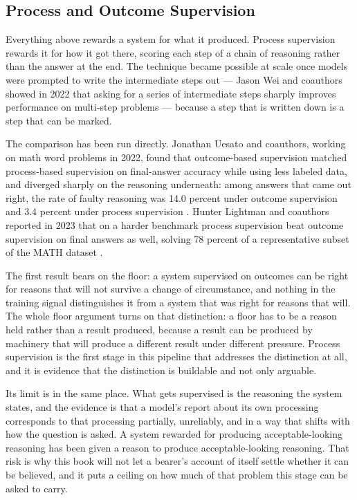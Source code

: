\subsection{Process and Outcome Supervision}
\label{sec:4.2.5}
Everything above rewards a system for what it produced. Process supervision rewards it for how it got there, scoring each step of a chain of reasoning rather than the answer at the end. The technique became possible at scale once models were prompted to write the intermediate steps out — Jason Wei and coauthors showed in 2022 that asking for a series of intermediate steps sharply improves performance on multi-step problems \autocite{wei2022chain} — because a step that is written down is a step that can be marked.

The comparison has been run directly. Jonathan Uesato and coauthors, working on math word problems in 2022, found that outcome-based supervision matched process-based supervision on final-answer accuracy while using less labeled data, and diverged sharply on the reasoning underneath: among answers that came out right, the rate of faulty reasoning was 14.0 percent under outcome supervision and 3.4 percent under process supervision \autocite{uesato2022solving}. Hunter Lightman and coauthors reported in 2023 that on a harder benchmark process supervision beat outcome supervision on final answers as well, solving 78 percent of a representative subset of the MATH dataset \autocite{lightman2023lets}.

The first result bears on the floor: a system supervised on outcomes can be right for reasons that will not survive a change of circumstance, and nothing in the training signal distinguishes it from a system that was right for reasons that will. The whole floor argument turns on that distinction: a floor has to be a reason held rather than a result produced, because a result can be produced by machinery that will produce a different result under different pressure. Process supervision is the first stage in this pipeline that addresses the distinction at all, and it is evidence that the distinction is buildable and not only arguable.

Its limit is in the same place. What gets supervised is the reasoning the system states, and the evidence is that a model's report about its own processing corresponds to that processing partially, unreliably, and in a way that shifts with how the question is asked. A system rewarded for producing acceptable-looking reasoning has been given a reason to produce acceptable-looking reasoning. That risk is why this book will not let a bearer's account of itself settle whether it can be believed, and it puts a ceiling on how much of that problem this stage can be asked to carry.
